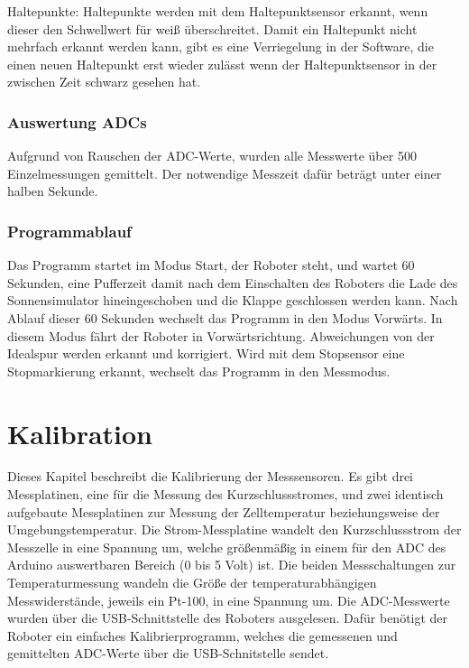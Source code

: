\documentclass[a4paper,bibtotoc,oneside]{scrbook}
\begin{document}
Haltepunkte: Haltepunkte werden mit dem Haltepunktsensor erkannt, wenn dieser den Schwellwert für weiß überschreitet. Damit ein Haltepunkt nicht mehrfach erkannt werden kann, gibt es eine Verriegelung in der Software, die einen neuen Haltepunkt erst wieder zulässt wenn der Haltepunktsensor in der zwischen Zeit schwarz gesehen hat.



\subsection{Auswertung ADCs}\thispagestyle{empty}
Aufgrund von Rauschen der ADC-Werte, wurden alle Messwerte über 500 Einzelmessungen gemittelt. Der notwendige Messzeit dafür beträgt unter einer halben Sekunde. 

\subsection{Programmablauf}\thispagestyle{empty}
Das Programm startet im Modus Start, der Roboter steht, und wartet 60 Sekunden, eine Pufferzeit damit nach dem Einschalten des Roboters die Lade des Sonnensimulator hineingeschoben und die Klappe geschlossen werden kann.
Nach Ablauf dieser 60 Sekunden wechselt das Programm in den Modus Vorwärts. In diesem Modus fährt der Roboter in Vorwärtsrichtung. Abweichungen von der Idealspur werden erkannt und korrigiert. Wird mit dem Stopsensor eine Stopmarkierung erkannt, wechselt das Programm in den Messmodus. 



\chapter{Kalibration}\thispagestyle{empty}

Dieses Kapitel beschreibt die Kalibrierung der Messsensoren. Es gibt drei Messplatinen, eine für die Messung des Kurzschlussstromes, und zwei identisch aufgebaute Messplatinen zur Messung der Zelltemperatur beziehungsweise der Umgebungstemperatur. Die Strom-Messplatine wandelt den Kurzschlussstrom der Messzelle in eine Spannung um, welche größenmäßig in einem für den ADC des Arduino auswertbaren Bereich (0 bis 5 Volt) ist. Die beiden Messschaltungen zur Temperaturmessung wandeln die Größe der temperaturabhängigen Messwiderstände, jeweils ein Pt-100, in eine Spannung um.
Die ADC-Messwerte wurden über die USB-Schnittstelle des Roboters ausgelesen. Dafür benötigt der Roboter ein einfaches Kalibrierprogramm, welches die gemessenen und gemittelten ADC-Werte über die USB-Schnitstelle sendet. 
\end{document}
